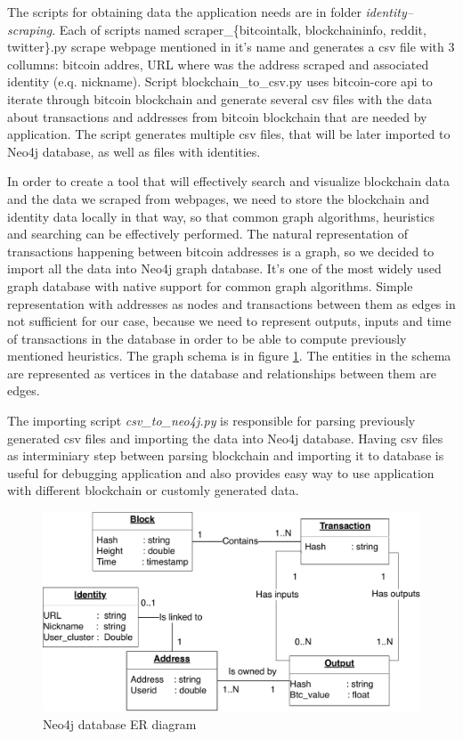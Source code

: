\documentclass[
  digital, %
  table,   %
  lof,     %
  lot,     %
  oneside
]{fithesis3}
\begin{document}
The scripts for obtaining data the application needs are in folder \emph{identity--scraping}.
Each of scripts named scraper\_\{bitcointalk, blockchaininfo, reddit, twitter\}.py scrape webpage mentioned
in it's name and generates a csv file with 3 collumns:
bitcoin addres, URL where was the address scraped and associated identity (e.q. nickname).
Script blockchain\_to\_csv.py uses bitcoin-core api to iterate through bitcoin blockchain 
and generate several csv files with the data about transactions and addresses from bitcoin blockchain that are needed by application.
The script generates multiple csv files, that will be later imported to Neo4j database, as well as 
files with identities.

In order to create a tool that will effectively search and visualize blockchain data and the 
data we scraped from webpages, we need to store the blockchain and identity data locally in that way, so that common
graph algorithms, heuristics and searching can be effectively performed.
The natural representation of transactions happening between
bitcoin addresses is a graph, so we decided to import all the data into Neo4j graph database. It's one of the
most widely used graph database with native support for common graph algorithms.
Simple representation with addresses as nodes and transactions between them as edges in not
sufficient for our case, because we need to represent
outputs, inputs and time of transactions in the database in order to be able to compute previously mentioned heuristics. 
The graph schema is in figure \ref{neo4jschema}. The entities in the schema are represented as vertices
 in the database and relationships between them are edges.

The importing script \emph{csv\_to\_neo4j.py} is responsible for parsing
previously generated csv files and importing the data into Neo4j database.
Having csv files as interminiary step between parsing blockchain and importing it to database
is useful for debugging application and also provides easy way to
use application with different blockchain or customly generated data.

\begin{figure}[!htb]
    \centering
    \includegraphics[width=1\textwidth]{neo4j-schema}
    \caption{Neo4j database ER diagram}
    \label{neo4jschema}
\end{figure}
\end{document}
